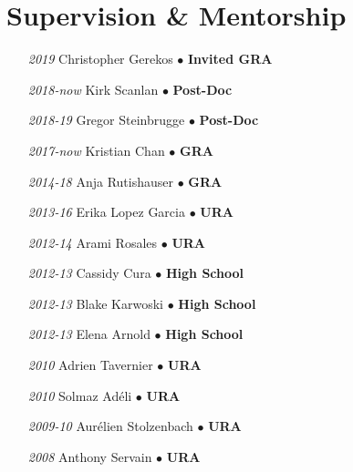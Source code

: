 \section*{Supervision \& Mentorship}

\begin{itemize}[leftmargin=5.8em, labelsep=1.5em]
\setlength\itemsep{-.5em}
    \item[\textit{2019}] Christopher Gerekos $\bullet$ \textbf{Invited GRA}
    \item[\textit{2018-now}] Kirk Scanlan $\bullet$ \textbf{Post-Doc}
    \item[\textit{2018-19}] Gregor Steinbrugge $\bullet$ \textbf{Post-Doc}
    \item[\textit{2017-now}] Kristian Chan $\bullet$ \textbf{GRA}
    \item[\textit{2014-18}] Anja Rutishauser $\bullet$ \textbf{GRA}
    \item[\textit{2013-16}] Erika Lopez Garcia $\bullet$ \textbf{URA}
    \item[\textit{2012-14}] Arami Rosales $\bullet$ \textbf{URA}
    \item[\textit{2012-13}] Cassidy Cura $\bullet$ \textbf{High School}
    \item[\textit{2012-13}] Blake Karwoski $\bullet$ \textbf{High School}
    \item[\textit{2012-13}] Elena Arnold $\bullet$ \textbf{High School}
    \item[\textit{2010}] Adrien Tavernier $\bullet$ \textbf{URA}
    \item[\textit{2010}] Solmaz Adéli $\bullet$ \textbf{URA}
    \item[\textit{2009-10}] Aurélien Stolzenbach $\bullet$ \textbf{URA}
    \item[\textit{2008}] Anthony Servain $\bullet$ \textbf{URA}
\end{itemize}
